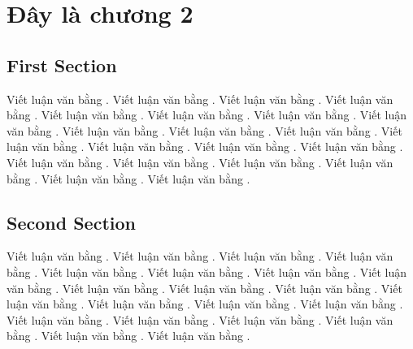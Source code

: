 \chapter{Đây là chương 2}
\ifpdf
    \graphicspath{{Chapter2/Chapter2Figs/PNG/}{Chapter2/Chapter2Figs/PDF/}{Chapter2/Chapter2Figs/}}
\else
    \graphicspath{{Chapter2/Chapter2Figs/EPS/}{Chapter2/Chapter2Figs/}}
\fi

\section{First Section}
Viết luận văn bằng  . Viết luận văn bằng  . Viết luận văn bằng  . Viết luận văn bằng  . Viết luận văn bằng  . Viết luận văn bằng  . Viết luận văn bằng  . Viết luận văn bằng  . Viết luận văn bằng  . Viết luận văn bằng  . Viết luận văn bằng  . Viết luận văn bằng  . Viết luận văn bằng  . Viết luận văn bằng  . Viết luận văn bằng  . Viết luận văn bằng  . Viết luận văn bằng  . Viết luận văn bằng  . Viết luận văn bằng  . Viết luận văn bằng  . Viết luận văn bằng  . 



\section{Second Section}
Viết luận văn bằng  . Viết luận văn bằng  . Viết luận văn bằng  . Viết luận văn bằng  . Viết luận văn bằng  . Viết luận văn bằng  . Viết luận văn bằng  . Viết luận văn bằng  . Viết luận văn bằng  . Viết luận văn bằng  . Viết luận văn bằng  . Viết luận văn bằng  . Viết luận văn bằng  . Viết luận văn bằng  . Viết luận văn bằng  . Viết luận văn bằng  . Viết luận văn bằng  . Viết luận văn bằng  . Viết luận văn bằng  . Viết luận văn bằng  . Viết luận văn bằng  . 


